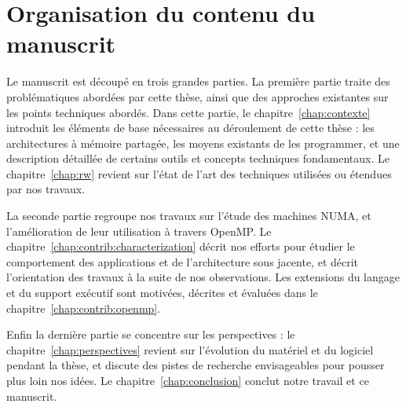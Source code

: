 \section{Organisation du contenu du manuscrit}\label{sec:intro:outline}

Le manuscrit est découpé en trois grandes parties.
La première partie traite des problématiques abordées par cette thèse, ainsi que des approches existantes sur les points techniques abordés.
Dans cette partie, le chapitre~\ref{chap:contexte} introduit les éléments de base nécessaires au déroulement de cette thèse : les architectures à mémoire partagée, les moyens existants de les programmer, et une description détaillée de certains outils et concepts techniques fondamentaux.
Le chapitre~\ref{chap:rw} revient sur l'état de l'art des techniques utilisées ou étendues par nos travaux.

La seconde partie regroupe nos travaux sur l'étude des machines NUMA, et l'amélioration de leur utilisation à travers OpenMP.
Le chapitre~\ref{chap:contrib:characterization} décrit nos efforts pour étudier le comportement des applications et de l'architecture sous jacente, et décrit l'orientation des travaux à la suite de nos observations.
Les extensions du langage et du support exécutif sont motivées, décrites et évaluées dans le chapitre~\ref{chap:contrib:openmp}.

Enfin la dernière partie se concentre sur les perspectives : le chapitre~\ref{chap:perspectives} revient sur l'évolution du matériel et du logiciel pendant la thèse, et discute des pistes de recherche envisageables pour pousser plus loin nos idées. Le chapitre~\ref{chap:conclusion} conclut notre travail et ce manuscrit.
